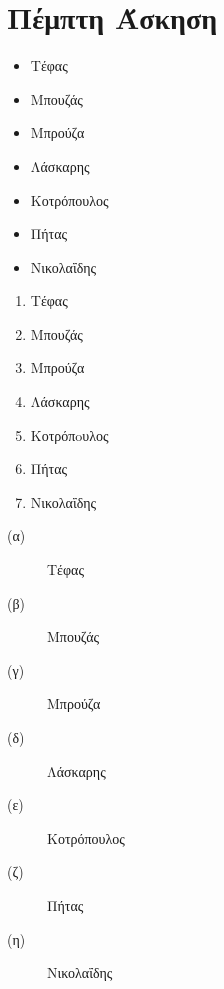 \documentclass[a4paper,11pt]{article}
\begin{document}
    \section{Πέμπτη Άσκηση}
            \begin{itemize}
            \item Τέφας
            \item Μπουζάς
            \item Μπρούζα
            \item Λάσκαρης
            \item Κοτρόπουλος
            \item Πήτας
            \item Νικολαΐδης
        \end{itemize}
        
        \begin{enumerate}
            \item Τέφας
            \item Μπουζάς
            \item Μπρούζα
            \item Λάσκαρης
            \item Κοτρόπoυλος
            \item Πήτας
            \item Νικολαΐδης
        \end{enumerate}
        
        \begin{description}
           \item[(α)] Τέφας
           \item[(β)] Μπουζάς
           \item[(γ)] Μπρούζα
           \item[(δ)] Λάσκαρης
           \item[(ε)] Κοτρόπουλος
           \item[(ζ)] Πήτας
           \item[(η)] Νικολαΐδης
        \end{description}
    
\end{document}
